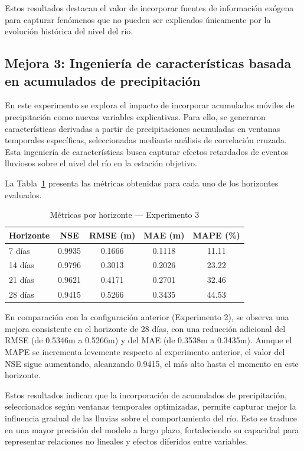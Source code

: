 Estos resultados destacan el valor de incorporar fuentes de información exógena para capturar fenómenos que no pueden ser explicados únicamente por la evolución histórica del nivel del río.


\subsection{Mejora 3: Ingeniería de características basada en acumulados de precipitación}
\label{ssec:exp3}

En este experimento se explora el impacto de incorporar acumulados móviles de precipitación como nuevas variables explicativas. Para ello, se generaron características derivadas a partir de precipitaciones acumuladas en ventanas temporales específicas, seleccionadas mediante análisis de correlación cruzada. Esta ingeniería de características busca capturar efectos retardados de eventos lluviosos sobre el nivel del río en la estación objetivo.

La Tabla~\ref{tab:exp3_metricas_horizontes} presenta las métricas obtenidas para cada uno de los horizontes evaluados.

\begin{table}[H]
\centering
\caption{Métricas por horizonte — Experimento 3}
\label{tab:exp3_metricas_horizontes}
\begin{tabular}{lcccc}
\toprule
\textbf{Horizonte} & \textbf{NSE} & \textbf{RMSE (m)} & \textbf{MAE (m)} & \textbf{MAPE (\%)} \\
\midrule
7 días  & 0.9935 & 0.1666 & 0.1118 & 11.11 \\
14 días & 0.9796 & 0.3013 & 0.2026 & 23.22 \\
21 días & 0.9621 & 0.4171 & 0.2701 & 32.46 \\
28 días & 0.9415 & 0.5266 & 0.3435 & 44.53 \\
\bottomrule
\end{tabular}
\end{table}

En comparación con la configuración anterior (Experimento 2), se observa una mejora consistente en el horizonte de 28 días, con una reducción adicional del RMSE (de 0.5346m a 0.5266m) y del MAE (de 0.3538m a 0.3435m). Aunque el MAPE se incrementa levemente respecto al experimento anterior, el valor del NSE sigue aumentando, alcanzando 0.9415, el más alto hasta el momento en este horizonte.

Estos resultados indican que la incorporación de acumulados de precipitación, seleccionados según ventanas temporales optimizadas, permite capturar mejor la influencia gradual de las lluvias sobre el comportamiento del río. Esto se traduce en una mayor precisión del modelo a largo plazo, fortaleciendo su capacidad para representar relaciones no lineales y efectos diferidos entre variables.

